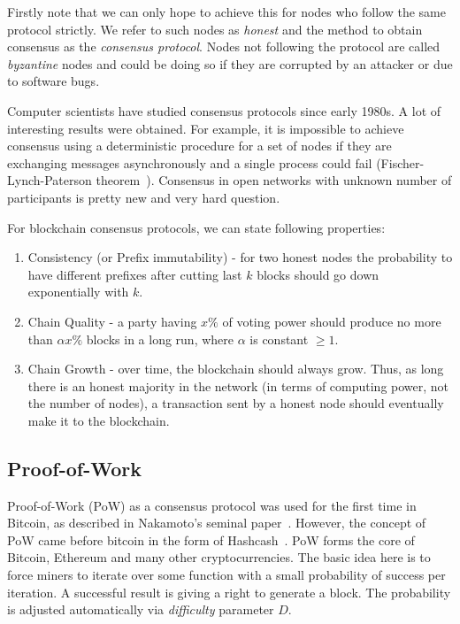 \documentclass[]{report}   %
\begin{document}
Firstly note that we can only hope to achieve this for nodes who follow the same protocol strictly. We refer to such nodes as \textit{honest} and the method to obtain consensus as the \textit{consensus protocol}. Nodes not following the protocol are called \textit{byzantine} nodes and could be doing so if they are corrupted by an attacker or due to software bugs. 


Computer scientists have  studied consensus protocols since early 1980s. A lot of interesting results were obtained. For example, it is impossible to achieve consensus using a deterministic procedure for a set of nodes if they are exchanging messages asynchronously and a single process could fail (Fischer-Lynch-Paterson theorem~\cite{fischer1985impossibility}). 
Consensus in open networks with unknown number of participants is pretty new and very hard question. 
%

For blockchain consensus protocols, we can state following properties:

\begin{enumerate}
\item{Consistency (or Prefix immutability)} - for two honest nodes the probability to have different prefixes after cutting last \(k\) blocks should go down exponentially with \(k\).
\item{Chain Quality} - a party having \(x\%\) of voting power should produce no more than \(\alpha x \%\) blocks in a long run, where \(\alpha\) is constant $\geq 1$.
\item{Chain Growth} - over time, the blockchain should always grow. Thus, as long there is an honest majority in the network (in terms of computing power, not the number of nodes), a transaction sent by a honest node should eventually make it to the blockchain.
\end{enumerate}


\subsection{Proof-of-Work}

Proof-of-Work (PoW) as a consensus protocol was used for the first time in Bitcoin, as described in Nakamoto's seminal paper~\cite{Nakamoto2008}.
However, the concept of PoW came before bitcoin in the form of Hashcash~\cite{back2002hashcash}.
PoW forms the core of Bitcoin, Ethereum and many other cryptocurrencies. The basic idea here is to force miners to iterate over some function with a small probability of success per iteration. A successful result is giving a right to generate a block. The probability is adjusted automatically via \textit{difficulty} parameter \(D\). 
\end{document}
